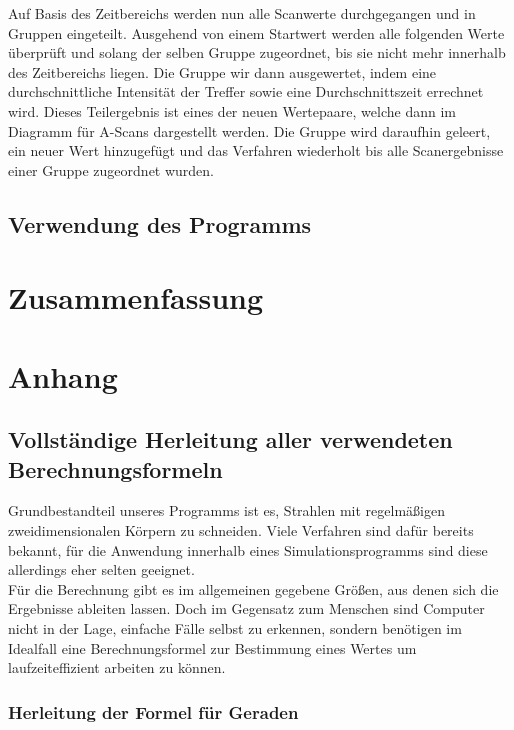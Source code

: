 \documentclass[reducespace,stylepage,semiarbeit]{spezidoc}
\begin{document}
Auf Basis des Zeitbereichs werden nun alle Scanwerte durchgegangen und in Gruppen eingeteilt. 
Ausgehend von einem Startwert werden alle folgenden Werte überprüft und solang der selben Gruppe zugeordnet, bis sie nicht mehr innerhalb des Zeitbereichs liegen. 
Die Gruppe wir dann ausgewertet, indem eine durchschnittliche Intensität der Treffer sowie eine Durchschnittszeit errechnet wird. 
Dieses Teilergebnis ist eines der neuen Wertepaare, welche dann im Diagramm für A-Scans dargestellt werden. 
Die Gruppe wird daraufhin geleert, ein neuer Wert hinzugefügt und das Verfahren wiederholt bis alle Scanergebnisse einer Gruppe zugeordnet wurden.


\subsection{Verwendung des Programms} %


\newpage
\section{Zusammenfassung}



\newpage
\section{Anhang}

\subsection{Vollständige Herleitung aller verwendeten Berechnungsformeln}
Grundbestandteil unseres Programms ist es, Strahlen mit regelmäßigen zweidimensionalen Körpern zu schneiden. Viele Verfahren sind dafür bereits bekannt, für die Anwendung innerhalb eines Simulationsprogramms sind diese allerdings eher selten geeignet.\\
Für die Berechnung gibt es im allgemeinen gegebene Größen, aus denen sich die Ergebnisse ableiten lassen. Doch im Gegensatz zum Menschen sind Computer nicht in der Lage, einfache Fälle selbst zu erkennen, sondern benötigen im Idealfall eine Berechnungsformel zur Bestimmung eines Wertes um laufzeiteffizient arbeiten zu können.

\subsubsection*{Herleitung der Formel für Geraden}
\end{document}
